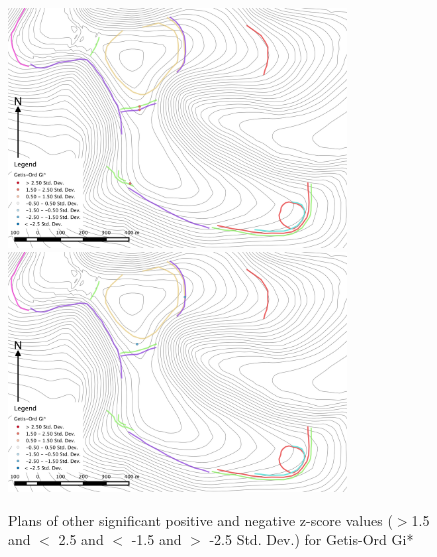 \begin{figure}
\centering
	\includegraphics[width=0.8\textwidth]{figures/hotspot-2}
	\includegraphics[width=0.8\textwidth]{figures/hotspot-6}
  \caption{Plans of other significant positive and negative z-score values ($>$1.5 and $<$ 2.5 and $<$ -1.5 and $>$ -2.5 Std. Dev.)  for Getis-Ord Gi*}
  \label{fig:hotspot-2}
\end{figure}

